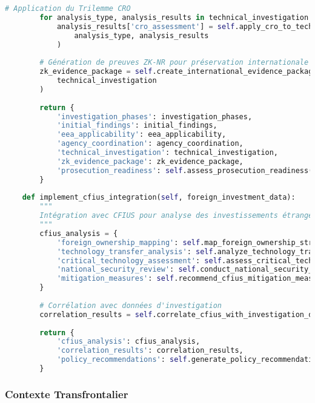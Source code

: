 \begin{lstlisting}[language=Python, caption=Investigation selon méthodologie FBI avec framework CRO]
        # Application du Trilemme CRO
        for analysis_type, analysis_results in technical_investigation.items():
            analysis_results['cro_assessment'] = self.apply_cro_to_technical_analysis(
                analysis_type, analysis_results
            )
            
        # Génération de preuves ZK-NR pour préservation internationale
        zk_evidence_package = self.create_international_evidence_package(
            technical_investigation
        )
        
        return {
            'investigation_phases': investigation_phases,
            'initial_findings': initial_findings,
            'eea_applicability': eea_applicability,
            'agency_coordination': agency_coordination,
            'technical_investigation': technical_investigation,
            'zk_evidence_package': zk_evidence_package,
            'prosecution_readiness': self.assess_prosecution_readiness(technical_investigation)
        }
    
    def implement_cfius_integration(self, foreign_investment_data):
        """
        Intégration avec CFIUS pour analyse des investissements étrangers
        """
        cfius_analysis = {
            'foreign_ownership_mapping': self.map_foreign_ownership_structures(),
            'technology_transfer_analysis': self.analyze_technology_transfer_patterns(),
            'critical_technology_assessment': self.assess_critical_technology_impact(),
            'national_security_review': self.conduct_national_security_review(),
            'mitigation_measures': self.recommend_cfius_mitigation_measures()
        }
        
        # Corrélation avec données d'investigation
        correlation_results = self.correlate_cfius_with_investigation_data(cfius_analysis)
        
        return {
            'cfius_analysis': cfius_analysis,
            'correlation_results': correlation_results,
            'policy_recommendations': self.generate_policy_recommendations(correlation_results)
        }
\end{lstlisting}


\subsubsection{Contexte Transfrontalier}

